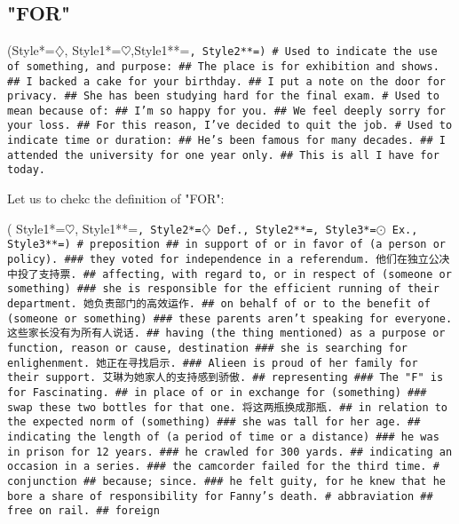 \subsection{"FOR"}

\begin{easylist}[checklist]
\ListProperties(Style*=$\diamondsuit$\quad, Style1*=$\heartsuit$\quad,Style1**=\large\tt\color{google@red}, Style2**=\tt\color{google@blue})
# Used to indicate the use of something, and purpose:
## The place is for exhibition and shows.
## I backed a cake for your birthday.
## I put a note on the door for privacy.
## She has been studying hard for the final exam.
# Used to mean because of:
## I'm so happy for you.
## We feel deeply sorry for your loss.
## For this reason, I've decided to quit the job.
# Used to indicate time or duration:
## He's been famous for many decades.
## I attended the university for one year only.
## This is all I have for today.
\end{easylist}

\medskip
\noindent Let us to chekc the definition of "FOR":
\begin{easylist}[checklist]
\ListProperties( Style1*=$\heartsuit$\quad, Style1**=\Large\tt\color{google@yellow},
                 Style2*={\color{red}\tt$\diamondsuit$ Def.}\quad, Style2**=\tt\color{google@red},
                 Style3*={\color{red}\tt$\odot$ Ex.}\quad, Style3**=\tt\color{google@blue})
# preposition
## in support of or in favor of (a person or policy).
### they voted for independence in a referendum.
\chn 他们在独立公决中投了支持票.
## affecting, with regard to, or in respect of (someone or something)
### she is responsible for the efficient running of their department.
\chn 她负责部门的高效运作.
## on behalf of or to the benefit of (someone or something) 
### these parents aren't speaking for everyone.
\chn 这些家长没有为所有人说话.
##  having (the thing mentioned) as a purpose or function, reason or cause, destination
### she is searching for enlighenment.
\chn 她正在寻找启示.
### Alieen is proud of her family for their support.
\chn 艾琳为她家人的支持感到骄傲.
## representing
### The "F" is for Fascinating.
## in place of or in exchange for (something)
### swap these two bottles for that one.
\chn 将这两瓶换成那瓶.
## in relation to the expected norm of (something)
### she was tall for her age.
## indicating the length of (a period of time or a distance)
### he was in prison for 12 years.
### he crawled for 300 yards.
## indicating an occasion in a series.
### the camcorder failed for the third time.
# conjunction
## because; since.
### he felt guity, for he knew that he bore a share of responsibility for Fanny's death.
# abbraviation
## free on rail.
## foreign
\end{easylist}